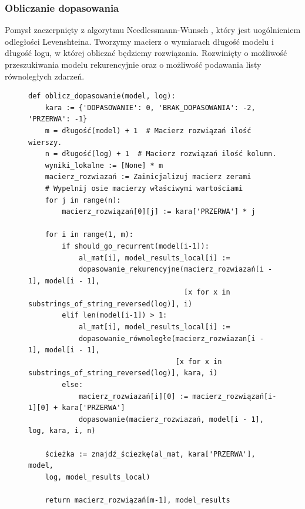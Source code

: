 \subsubsection{Obliczanie dopasowania}
Pomysł zaczerpnięty z algorytmu Needlessmann-Wunsch \cite{ea252fd3937a4a309a5e07e61e5531a7}, który jest uogólnieniem odległości Levenshteina. Tworzymy macierz o wymiarach długość modelu i długość logu, w której obliczać będziemy rozwiązania. Rozwinięty o możliwość przeszukiwania modelu rekurencyjnie oraz o możliwość podawania listy równoległych zdarzeń. 
\begin{figure}[!ht]
\lstset{caption=Obliczanie dopasowania, captionpos=b}
\lstset{label=src:alignment_calculation, frame=single}
\begin{lstlisting}
def oblicz_dopasowanie(model, log):
    kara := {'DOPASOWANIE': 0, 'BRAK_DOPASOWANIA': -2, 'PRZERWA': -1}
    m = długość(model) + 1  # Macierz rozwiązań ilość wierszy.
    n = długość(log) + 1  # Macierz rozwiązań ilość kolumn.
    wyniki_lokalne := [None] * m
    macierz_rozwiazań := Zainicjalizuj macierz zerami
    # Wypelnij osie macierzy właściwymi wartościami
    for j in range(n):
        macierz_rozwiązań[0][j] := kara['PRZERWA'] * j

    for i in range(1, m):
        if should_go_recurrent(model[i-1]):
            al_mat[i], model_results_local[i] := 
            dopasowanie_rekurencyjne(macierz_rozwiazań[i - 1], model[i - 1],
                                     [x for x in substrings_of_string_reversed(log)], i)
        elif len(model[i-1]) > 1:
            al_mat[i], model_results_local[i] := 
            dopasowanie_równoległe(macierz_rozwiazan[i - 1], model[i - 1],
                                   [x for x in substrings_of_string_reversed(log)], kara, i)
        else:
            macierz_rozwiazań[i][0] := macierz_rozwiązań[i-1][0] + kara['PRZERWA']
            dopasowanie(macierz_rozwiazań, model[i - 1], log, kara, i, n)

    ścieżka := znajdź_ściezkę(al_mat, kara['PRZERWA'], model, 
    log, model_results_local)

    return macierz_rozwiązań[m-1], model_results
\end{lstlisting}
\end{figure}

